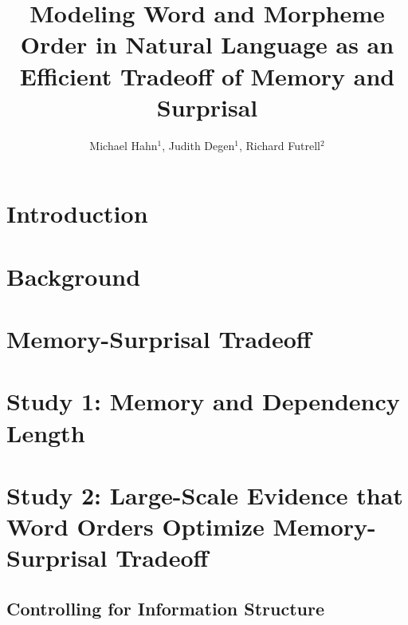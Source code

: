 \documentclass[man,floatsintext]{apa7}
\title{Modeling Word and Morpheme Order in Natural Language as an Efficient Tradeoff of Memory and Surprisal}
\author{Michael Hahn$^1$, Judith Degen$^1$, Richard Futrell$^2$}
\affiliation{$^1$ Stanford University, $^2$ University of California, Irvine}
\newcommand{\jd}[1]{\textcolor{Purple}{[jd: #1]}}
\begin{document}
\maketitle


\section{Introduction}



\section{Background}\label{sec:background}





\section{Memory-Surprisal Tradeoff}\label{sec:ms-tradeoff}



\section{Study 1: Memory and Dependency Length}\label{sec:toy-study}





\section{Study 2: Large-Scale Evidence that Word Orders Optimize Memory-Surprisal Tradeoff}
\label{sec:main-experiment}



\subsection{Controlling for Information Structure}\label{subsec:freedom}


\end{document}
